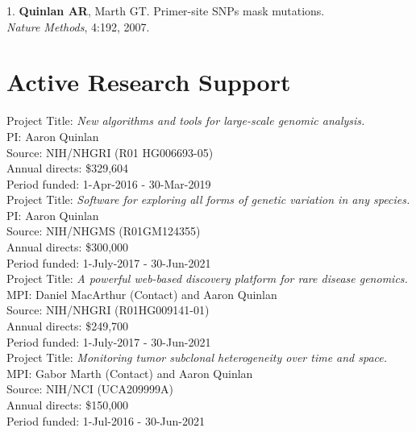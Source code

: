 \documentclass[margin,line]{cv}
\begin{document}
\begin{resume}
\begin{list}{*}{}
    \item[1.] \textbf{Quinlan AR}, Marth GT.
    Primer-site SNPs mask mutations.\\
    \textit{Nature Methods}, 4:192, 2007.

    \end{list}



    \section{\mysidestyle Active Research Support}

    Project Title: \textit{New algorithms and tools for large-scale genomic analysis.} \\
    PI: Aaron Quinlan \\
    Source: NIH/NHGRI (R01 HG006693-05) \\
    Annual directs: \$329,604 \\
    Period funded: 1-Apr-2016 - 30-Mar-2019 \\

    Project Title: \textit{Software for exploring all forms of genetic variation in any species.} \\
    PI: Aaron Quinlan \\
    Source: NIH/NHGMS (R01GM124355) \\
    Annual directs: \$300,000 \\
    Period funded: 1-July-2017 - 30-Jun-2021 \\

    Project Title: \textit{A powerful web-based discovery platform for rare disease genomics.} \\
    MPI: Daniel MacArthur (Contact) and Aaron Quinlan \\
    Source: NIH/NHGRI (R01HG009141-01) \\
    Annual directs: \$249,700 \\
    Period funded: 1-July-2017 - 30-Jun-2021 \\

    Project Title: \textit{Monitoring tumor subclonal heterogeneity over time and space.} \\
    MPI: Gabor Marth (Contact) and Aaron Quinlan \\
    Source: NIH/NCI (UCA209999A) \\
    Annual directs: \$150,000 \\
    Period funded: 1-Jul-2016 - 30-Jun-2021 \\


\end{resume}
\end{document}
